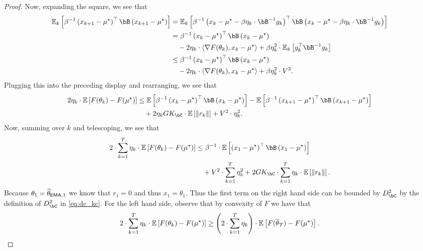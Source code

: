 \begin{proof}
     Now, expanding the square, we see that
     \begin{align}
        \ee_k\left[ \beta^{-1} \left( x_{k+1} - \mustar \right)^\top  \bB \left( x_{k+1} - \mustar \right) \right] &= \ee_k\left[ \beta^{-1} \left( x_k  - \mustar - \beta \eta_k \cdot \bB^{-1} g_k \right)^\top \bB \left( x_k  - \mustar - \beta \eta_k \cdot \bB^{-1} g_k \right) \right] \\
        &= \beta^{-1} \left( x_k - \mustar \right)^\top \bB \left( x_k - \mustar \right) \\
        &\quad - 2 \eta_k \cdot \inprod{\nabla F(\theta_k)}{x_k - \mustar} + \beta \eta_k^2 \cdot \ee_k\left[ g_k^\top \bB^{-1} g_k \right] \\
        &\leq \beta^{-1} \left( x_k - \mustar \right)^\top \bB \left( x_k - \mustar \right) \\
        &\quad - 2 \eta_k \cdot \inprod{\nabla F(\theta_k)}{x_k - \mustar} + \beta \eta_k^2 \cdot V^2.
     \end{align}
     Plugging this into the preceding display and rearranging, we see that
     \begin{align}
        2 \eta_k \cdot \ee\left[ F(\theta_k) - F(\mustar) \right] &\leq \ee\left[  \beta^{-1} \left( x_k - \mustar \right)^\top \bB \left( x_k - \mustar \right) \right] - \ee\left[ \beta^{-1} \left( x_{k+1} - \mustar \right)^\top  \bB \left( x_{k+1} - \mustar \right) \right] \\
        &\quad + 2 \eta_k G K_{\bC} \cdot \ee\left[ \norm{r_k} \right] +  V^2 \cdot \eta_k^2.
     \end{align}
     Now, summing over $k$ and telescoping, we see that
     \begin{align}
        2 \cdot \sum_{k  =1}^T \eta_k \cdot \ee\left[ F(\theta_k) - F(\mustar) \right] &\leq \beta^{-1} \cdot \ee\left[ \left( x_1 - \mustar \right)^\top \bB \left( x_1 - \mustar \right) \right] \\
        &\quad + V^2 \cdot \sum_{k  =1}^T \eta_k^2 + 2 G K_{\bC} \cdot \sum_{k=1}^T \eta_k \cdot \ee\left[ \norm{r_k} \right].
     \end{align}
     Because $\theta_1 = \thetema[1]$ we know that $r_1 = 0$ and thus $x_1 = \theta_1$.  Thus the first term on the right hand side can be bounded by $D_{\bC}^2$ by the definition of $D_{\bC}^2$ in \eqref{eq:dc_kc}.  For the left hand side, observe that by convexity of $F$ we have that
     \begin{align}
        2 \cdot \sum_{k  =1}^T \eta_k \cdot \ee\left[ F(\theta_k) - F(\mustar) \right] \geq \left( 2 \cdot \sum_{k  =1}^T \eta_k \right) \cdot \ee\left[ F(\thetabar_T) - F(\mustar) \right].

\end{align}
\end{proof}
